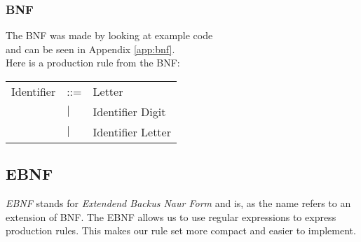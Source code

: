 \begin{comment}
			$Type$\\
			$While$\\
			$Width$\\
		\end{longtable}
	\end{comment}
	\subsubsection{BNF}
		The BNF was made by looking at example code \\
		and can be seen in Appendix \ref{app:bnf}. \\
		Here is a production rule from the BNF: \\
		\begin{tabular}{l l l}
		Identifier			&	::=	&Letter\\
							&$\mid$	&Identifier Digit\\
							&$\mid$	&Identifier Letter\\
		\end{tabular}
	
	\subsection{EBNF}
		{\it EBNF} stands for {\it Extendend Backus Naur Form} and is, as the name refers to an extension of BNF.
		The EBNF allows us to use regular expressions to express production rules. 
		This makes our rule set more compact and easier to implement.
	
